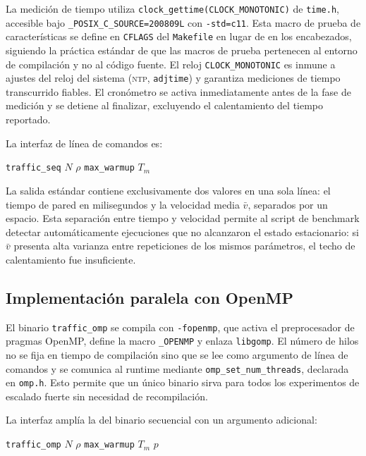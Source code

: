 La medición de tiempo utiliza
\texttt{clock\_gettime(CLOCK\_MONOTONIC)} de \texttt{time.h}, accesible
bajo \texttt{\_POSIX\_C\_SOURCE=200809L} con \texttt{-std=c11}. Esta macro
de prueba de características se define en \texttt{CFLAGS} del
\texttt{Makefile} en lugar de en los encabezados, siguiendo la práctica
estándar de que las macros de prueba pertenecen al entorno de compilación
y no al código fuente. El reloj \texttt{CLOCK\_MONOTONIC} es inmune a
ajustes del reloj del sistema (\textsc{ntp}, \texttt{adjtime}) y garantiza
mediciones de tiempo transcurrido fiables. El cronómetro se activa
inmediatamente antes de la fase de medición y se detiene al finalizar,
excluyendo el calentamiento del tiempo reportado.

La interfaz de línea de comandos es:

\begin{center}
\texttt{traffic\_seq} $N$ $\rho$ \texttt{max\_warmup} $T_m$
\end{center}

La salida estándar contiene exclusivamente dos valores en una sola línea:
el tiempo de pared en milisegundos y la velocidad media $\bar{v}$,
separados por un espacio. Esta separación entre tiempo y velocidad permite
al script de benchmark detectar automáticamente ejecuciones que no
alcanzaron el estado estacionario: si $\bar{v}$ presenta alta varianza
entre repeticiones de los mismos parámetros, el techo de calentamiento fue
insuficiente.

\subsection{Implementación paralela con OpenMP}

El binario \texttt{traffic\_omp} se compila con \texttt{-fopenmp}, que
activa el preprocesador de pragmas OpenMP, define la macro
\texttt{\_OPENMP} y enlaza \texttt{libgomp}. El número de hilos no se fija
en tiempo de compilación sino que se lee como argumento de línea de
comandos y se comunica al runtime mediante \texttt{omp\_set\_num\_threads},
declarada en \texttt{omp.h}. Esto permite que un único binario sirva para
todos los experimentos de escalado fuerte sin necesidad de recompilación.

La interfaz amplía la del binario secuencial con un argumento adicional:

\begin{center}
\texttt{traffic\_omp} $N$ $\rho$ \texttt{max\_warmup} $T_m$ $p$
\end{center}

